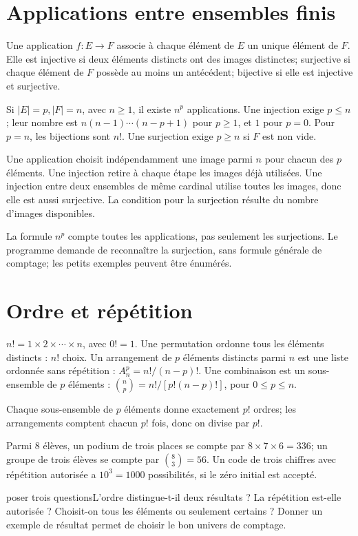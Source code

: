 \section{Applications entre ensembles finis}
\begin{definition}Une application $f:E\to F$ associe à chaque élément de $E$ un unique élément de $F$. Elle est injective si deux éléments distincts ont des images distinctes; surjective si chaque élément de $F$ possède au moins un antécédent; bijective si elle est injective et surjective.\end{definition}
\begin{propriete}Si $|E|=p,|F|=n$, avec $n\ge1$, il existe $n^p$ applications. Une injection exige $p\le n$; leur nombre est $n(n-1)\cdots(n-p+1)$ pour $p\ge1$, et $1$ pour $p=0$. Pour $p=n$, les bijections sont $n!$. Une surjection exige $p\ge n$ si $F$ est non vide.\end{propriete}
\begin{demonstration}Une application choisit indépendamment une image parmi $n$ pour chacun des $p$ éléments. Une injection retire à chaque étape les images déjà utilisées. Une injection entre deux ensembles de même cardinal utilise toutes les images, donc elle est aussi surjective. La condition pour la surjection résulte du nombre d’images disponibles.\end{demonstration}
\begin{remarque}La formule $n^p$ compte toutes les applications, pas seulement les surjections. Le programme demande de reconnaître la surjection, sans formule générale de comptage; les petits exemples peuvent être énumérés.\end{remarque}
\section{Ordre et répétition}
\begin{definition}$n!=1\times2\times\cdots\times n$, avec $0!=1$. Une permutation ordonne tous les éléments distincts : $n!$ choix. Un arrangement de $p$ éléments distincts parmi $n$ est une liste ordonnée sans répétition : $A_n^p=n!/(n-p)!$. Une combinaison est un sous-ensemble de $p$ éléments : $\binom np=n!/[p!(n-p)!]$, pour $0\le p\le n$.\end{definition}
\begin{demonstration}Chaque sous-ensemble de $p$ éléments donne exactement $p!$ ordres; les arrangements comptent chacun $p!$ fois, donc on divise par $p!$.\end{demonstration}
\begin{exemple}Parmi $8$ élèves, un podium de trois places se compte par $8\times7\times6=336$; un groupe de trois élèves se compte par $\binom83=56$. Un code de trois chiffres avec répétition autorisée a $10^3=1000$ possibilités, si le zéro initial est accepté.\end{exemple}
\begin{methode}{poser trois questions}L’ordre distingue-t-il deux résultats ? La répétition est-elle autorisée ? Choisit-on tous les éléments ou seulement certains ? Donner un exemple de résultat permet de choisir le bon univers de comptage.\end{methode}

